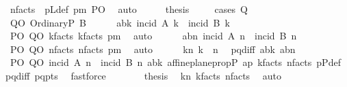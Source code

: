\begin{isabellebody}
\ n{\isacharunderscore}{\kern0pt}facts\ \ pLdef\ pm\ PO\ \isamarkupfalse%
\ auto\isanewline
\ \ \isamarkupfalse%
\ \isamarkupfalse%
\ {\isacharquery}{\kern0pt}thesis\ \isanewline
\ \ \isamarkupfalse%
\ {\isacharparenleft}{\kern0pt}cases\ Q{\isacharparenright}{\kern0pt}\isanewline
\ \ \ \ \isamarkupfalse%
\ QO{\isacharcolon}{\kern0pt}\ {\isacharparenleft}{\kern0pt}OrdinaryP\ B{\isacharparenright}{\kern0pt}\isanewline
\ \ \ \ \isamarkupfalse%
\ abk{}{\isacharcolon}{\kern0pt}\ {\isachardoublequoteopen}incid\ A\ k{}\ {\isasymand}\ incid\ B\ k{}{\isachardoublequoteclose}\ \isamarkupfalse%
\ PO\ QO\ k{}{\isacharunderscore}{\kern0pt}facts\ k{\isacharunderscore}{\kern0pt}facts\ pm\ \isamarkupfalse%
\ auto\isanewline
\ \ \ \ \isamarkupfalse%
\ abn{}{\isacharcolon}{\kern0pt}\ {\isachardoublequoteopen}incid\ A\ n{}\ {\isasymand}\ incid\ B\ n{}{\isachardoublequoteclose}\ \isamarkupfalse%
\ PO\ QO\ n{}{\isacharunderscore}{\kern0pt}facts\ n{\isacharunderscore}{\kern0pt}facts\ pm\ \isamarkupfalse%
\ auto\isanewline
\ \ \ \ \isamarkupfalse%
\ k{}n{}{\isacharcolon}{\kern0pt}\ {\isachardoublequoteopen}k{}\ {\isacharequal}{\kern0pt}\ n{}{\isachardoublequoteclose}\ \isamarkupfalse%
\ pq{\isacharunderscore}{\kern0pt}diff\ abk{}\ abn{}\isanewline
\ \ \ \ \ \ \isamarkupfalse%
\ PO\ QO\ {\isacartoucheopen}incid\ A\ n{}\ {\isasymand}\ incid\ B\ n{}{\isacartoucheclose}\ abk{}\ affine{\isacharunderscore}{\kern0pt}plane{\isachardot}{\kern0pt}prop{}P{}\ ap\ k{}{\isacharunderscore}{\kern0pt}facts\ n{}{\isacharunderscore}{\kern0pt}facts\ pPdef\ pq{\isacharunderscore}{\kern0pt}diff\ pq{\isacharunderscore}{\kern0pt}pts\ \isamarkupfalse%
\ fastforce\isanewline
\ \ \ \ \isamarkupfalse%
\ \isamarkupfalse%
\ {\isacharquery}{\kern0pt}thesis\ \isamarkupfalse%
\ k{}n{}\ k{}{\isacharunderscore}{\kern0pt}facts\ n{}{\isacharunderscore}{\kern0pt}facts\ \isamarkupfalse%
\ auto\isanewline
\ \ \isamarkupfalse%
\isanewline

\end{isabellebody}
